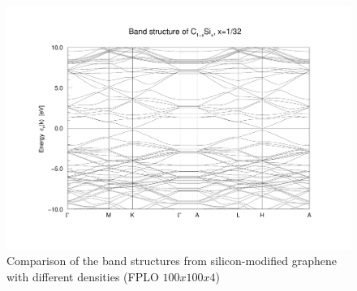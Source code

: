 \begin{figure}
\begin{minipage}[t]{0.3\textwidth}
					\end{minipage}
					\begin{minipage}[t]{0.3\textwidth}
						\includegraphics[width=\textwidth]{Results/Silicon/Silicon4/silicon4band.pdf}
					\end{minipage}															
					\caption{Comparison of the band structures from silicon-modified graphene with different densities (FPLO $100x100x4$)}
					\label{fig:SiliconDensityComparisson}
				\end{figure}
